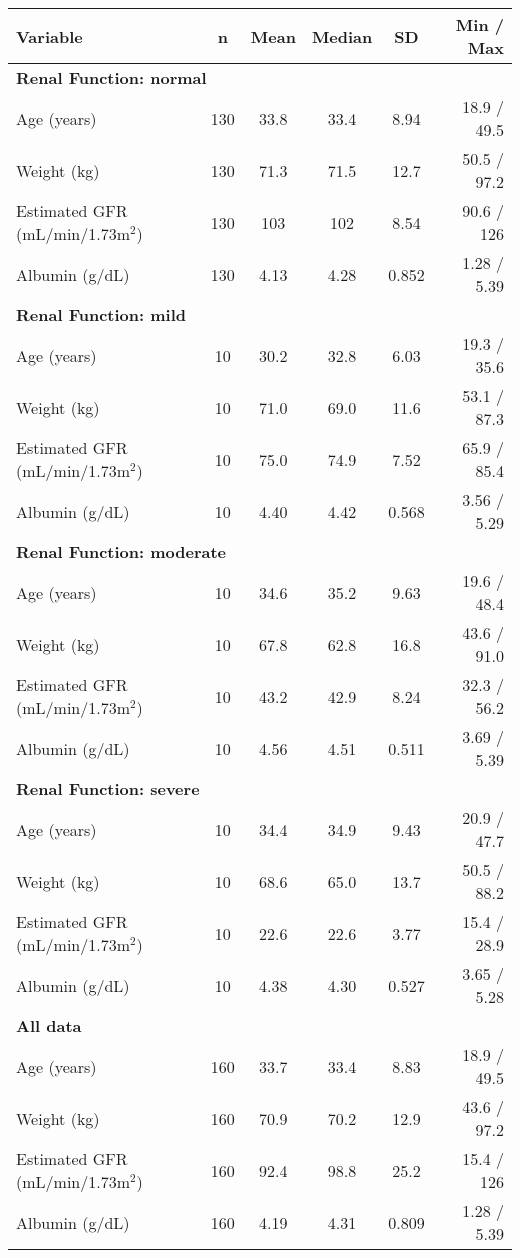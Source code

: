 \setlength{\tabcolsep}{5pt} 
\begin{threeparttable}
\renewcommand{\arraystretch}{1.3}
\begin{tabular}[h]{lccccr}
\hline
Variable & n & Mean & Median & SD & Min / Max \\
\hline
\multicolumn{6}{l}{\textbf{Renal Function: normal}}\\%
Age (years) & 130 & 33.8 & 33.4 & 8.94 & 18.9 / 49.5 \\
Weight (kg) & 130 & 71.3 & 71.5 & 12.7 & 50.5 / 97.2 \\
Estimated GFR (mL/min/1.73m$^2$) & 130 & 103 & 102 & 8.54 & 90.6 / 126 \\
Albumin (g/dL) & 130 & 4.13 & 4.28 & 0.852 & 1.28 / 5.39 \\
\hline \multicolumn{6}{l}{\textbf{Renal Function: mild}}\\%
Age (years) & 10 & 30.2 & 32.8 & 6.03 & 19.3 / 35.6 \\
Weight (kg) & 10 & 71.0 & 69.0 & 11.6 & 53.1 / 87.3 \\
Estimated GFR (mL/min/1.73m$^2$) & 10 & 75.0 & 74.9 & 7.52 & 65.9 / 85.4 \\
Albumin (g/dL) & 10 & 4.40 & 4.42 & 0.568 & 3.56 / 5.29 \\
\hline \multicolumn{6}{l}{\textbf{Renal Function: moderate}}\\%
Age (years) & 10 & 34.6 & 35.2 & 9.63 & 19.6 / 48.4 \\
Weight (kg) & 10 & 67.8 & 62.8 & 16.8 & 43.6 / 91.0 \\
Estimated GFR (mL/min/1.73m$^2$) & 10 & 43.2 & 42.9 & 8.24 & 32.3 / 56.2 \\
Albumin (g/dL) & 10 & 4.56 & 4.51 & 0.511 & 3.69 / 5.39 \\
\hline \multicolumn{6}{l}{\textbf{Renal Function: severe}}\\%
Age (years) & 10 & 34.4 & 34.9 & 9.43 & 20.9 / 47.7 \\
Weight (kg) & 10 & 68.6 & 65.0 & 13.7 & 50.5 / 88.2 \\
Estimated GFR (mL/min/1.73m$^2$) & 10 & 22.6 & 22.6 & 3.77 & 15.4 / 28.9 \\
Albumin (g/dL) & 10 & 4.38 & 4.30 & 0.527 & 3.65 / 5.28 \\
\hline \multicolumn{6}{l}{\textbf{All data}}\\%
Age (years) & 160 & 33.7 & 33.4 & 8.83 & 18.9 / 49.5 \\
Weight (kg) & 160 & 70.9 & 70.2 & 12.9 & 43.6 / 97.2 \\
Estimated GFR (mL/min/1.73m$^2$) & 160 & 92.4 & 98.8 & 25.2 & 15.4 / 126 \\
Albumin (g/dL) & 160 & 4.19 & 4.31 & 0.809 & 1.28 / 5.39 \\
\hline
\end{tabular}
\end{threeparttable}
